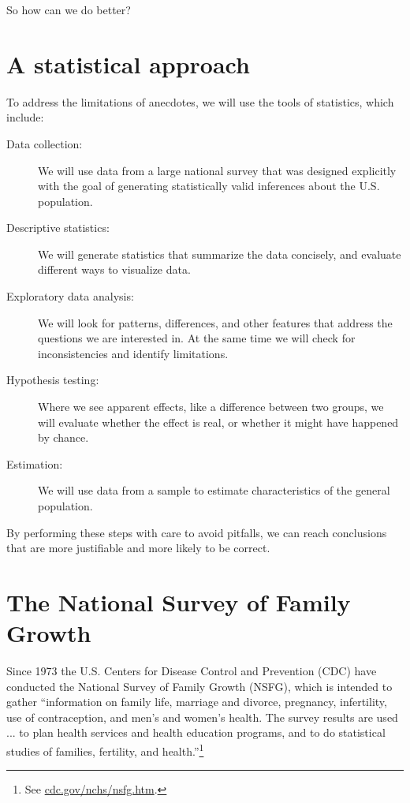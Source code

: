 \documentclass[12pt]{book}
\begin{document}
So how can we do better?

\section{A statistical approach}

To address the limitations of anecdotes, we will use the tools
of statistics, which include:

\begin{description}

\item[Data collection:] We will use data from a large national survey
  that was designed explicitly with the goal of generating
  statistically valid inferences about the U.S. population.

\item[Descriptive statistics:] We will generate statistics that
  summarize the data concisely, and evaluate different ways to
  visualize data.

\item[Exploratory data analysis:] We will look for
  patterns, differences, and other features that address the questions
  we are interested in.  At the same time we will check for
  inconsistencies and identify limitations.

\item[Hypothesis testing:] Where we see apparent effects, like a
  difference between two groups, we will evaluate whether the effect
  is real, or whether it might have happened by chance.

\item[Estimation:] We will use data from a sample to estimate
  characteristics of the general population.

\end{description}

By performing these steps with care to avoid pitfalls, we can
reach conclusions that are more justifiable and more likely to be
correct.


\section{The National Survey of Family Growth}
\label{nsfg}

Since 1973 the U.S. Centers for Disease Control and Prevention (CDC)
have conducted the National Survey of Family Growth (NSFG),
which is intended to gather ``information on family life, marriage and
divorce, pregnancy, infertility, use of contraception, and men's and
women's health. The survey results are used ... to plan health services and
health education programs, and to do statistical studies of families,
fertility, and health.''\footnote{See
  \url{cdc.gov/nchs/nsfg.htm}.}
\end{document}

